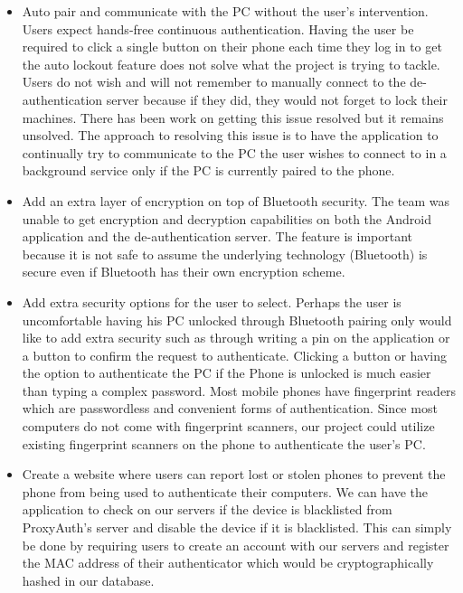\documentclass[letterpaper,twocolumn,10pt]{article}
\begin{document}
{{\begin{itemize}
\item Auto pair and communicate with the PC without the user's intervention. Users expect hands-free continuous authentication. Having the user be required to click a single button on their phone each time they log in to get the auto lockout feature does not solve what the project is trying to tackle. Users do not wish and will not remember to manually connect to the de-authentication server because if they did, they would not forget to lock their machines. There has been work on getting this issue resolved but it remains unsolved. The approach to resolving this issue is to have the application to continually try to communicate to the PC the user wishes to connect to in a background service only if the PC is currently paired to the phone.
\item  Add an extra layer of encryption on top of Bluetooth security. The team was unable to get encryption and decryption capabilities on both the Android application and the de-authentication server. The feature is important because it is not safe to assume the underlying technology (Bluetooth) is secure even if Bluetooth has their own encryption scheme.
\item Add extra security options for the user to select. Perhaps the user is uncomfortable having his PC unlocked through Bluetooth pairing only would like to add extra security such as through writing a pin on the application or a button to confirm the request to authenticate. Clicking a button or having the option to authenticate the PC if the Phone is unlocked is much easier than typing a complex password. Most mobile phones have fingerprint readers which are passwordless and convenient forms of authentication. Since most computers do not come with fingerprint scanners, our project could utilize existing fingerprint scanners on the phone to authenticate the user's PC.

\item Create a website where users can report lost or stolen phones to prevent the phone from being used to authenticate their computers. We can have the application to check on our servers if the device is blacklisted from ProxyAuth's server and disable the device if it is blacklisted. This can simply be done by requiring users to create an account with our servers and register the MAC address of their authenticator which would be cryptographically hashed in our database.
\end{itemize}

\hrulefill

}}
\end{document}
